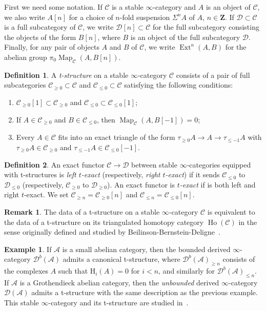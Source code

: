 \documentclass{article}
\theoremstyle{definition}
\newtheorem{definition}{Definition}[subsection]
\newtheorem{example}{Example}[subsection]
\newtheorem{remark}{Remark}[subsection]
\newcommand{\A}{\mathcal{A}}
\newcommand{\C}{\mathcal{C}}
\newcommand{\D}{\mathcal{D}}
\newcommand{\ZZ}{\mathbf{Z}}
\renewcommand{\i}{\infty}
\DeclareMathOperator{\Ext}{Ext}
\DeclareMathOperator{\Ho}{Ho}
\DeclareMathOperator{\Map}{Map}
\begin{document}
First we need some notation.
If $\C$ is a stable $\infty$-category and $A$ is an object of $\C$, we also write
$A[n]$ for a choice of $n$-fold suspension $\Sigma^n A$ of $A$, $n\in\ZZ$. If $\D\subset\C$ is a
full subcategory of $\C$, we write $\D[n]\subset\C$ for the full subcategory
consisting the objects of the form $B[n]$, where $B$ is an object of the full subcategory $\D$.
Finally, for any pair of objects $A$ and $B$ of $\C$, we write $\Ext^n(A,B)$ for the abelian group $\pi_0\Map_{\C}(A,B[n])$.

\begin{definition}\label{def:t}
A {\em t-structure} on a stable $\infty$-category $\C$ consists of a pair of full subcategories $\C_{\geq 0}\subset \C$ and $\C_{\leq 0}\subset \C$ satisfying the following conditions:
\begin{enumerate}\itemsep.1em
\item[(1)]
$\C_{\geq 0}[1]\subset \C_{\geq 0}$ and $\C_{\leq 0}\subset \C_{\leq 0}[1]$;
\item[(2)]
If $A\in \C_{\geq 0}$ and $B\in \C_{\leq 0}$, then $\Map_\C(A,B[-1])=0$;
\item[(3)]   Every $A\in \C$ fits into an exact triangle of the form
$
\tau_{\geq 0}A\to A\to\tau_{\leq -1}A
$
with $\tau_{\geq 0}A\in\C_{\geq 0}$ and $\tau_{\leq -1}A\in \C_{\leq 0}[-1]$.
\end{enumerate}
\end{definition}
\begin{definition}
An exact functor $\C\rightarrow\D$ between stable $\infty$-categories equipped with t-structures is {\em left $t$-exact} (respectively, {\em right $t$-exact}) if it sends $\C_{\leq 0}$ to $\D_{\leq 0}$ (respectively, $\C_{\geq 0}$ to $\D_{\geq 0}$). An exact functor is {\em $t$-exact} if is both left and right $t$-exact. We set $\C_{\geq n}=\C_{\geq 0}[n]$ and $\C_{\leq n}=\C_{\leq 0}[n]$.
\end{definition}
\begin{remark}
The data of a t-structure on a stable $\i$-category $\C$ is equivalent to the data of a t-structure on its triangulated homotopy category $\Ho(\C)$ in the sense originally defined and studied by Beilinson-Bernstein-Deligne~\cite{bbd}.
\end{remark}
\begin{example}\label{ex:t}
If $\A$ is a small abelian category, then the bounded derived $\infty$-category $\D^b(\A)$\index{$\D^b(\A)$}  admits a canonical t-structure, where $\D^b(\A)_{\geq n}$ consists of the complexes $A$ such that $\mathrm{H}_i(A)=0$ for $i<n$, and similarly for $\D^b(\A)_{\leq n}$.
If $\A$ is a Grothendieck abelian category, then the {\em unbounded} derived $\infty$-category $\D(\A)$ admits a t-structure with the same description as the previous example.
This stable $\infty$-category and its t-structure are studied in~\cite[Section~1.3.5]{HA}.
\end{example}
\end{document}
